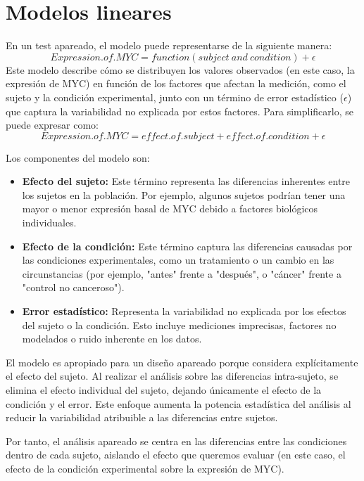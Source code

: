 \documentclass{config/apuntes}\usepackage[]{graphicx}\usepackage[]{xcolor}
\begin{document}
\section{Modelos lineares}
En un test apareado, el modelo puede representarse de la siguiente manera:
\[Expression.of.MYC = function(subject\ and\ condition) + \epsilon\]
Este modelo describe cómo se distribuyen los valores observados (en este caso, la expresión de MYC) en función de los factores que afectan la medición, como el sujeto y la condición experimental, junto con un término de error estadístico ($\epsilon$) que captura la variabilidad no explicada por estos factores. 
Para simplificarlo, se puede expresar como:
\[Expression.of.MYC = \mathit{effect.of.subject} + \mathit{effect.of.condition} + \epsilon\]

Los componentes del modelo son:
\begin{itemize}
\item \textbf{Efecto del sujeto:} Este término representa las diferencias inherentes entre los sujetos en la población. Por ejemplo, algunos sujetos podrían tener una mayor o menor expresión basal de MYC debido a factores biológicos individuales.
\item \textbf{Efecto de la condición:} Este término captura las diferencias causadas por las condiciones experimentales, como un tratamiento o un cambio en las circunstancias (por ejemplo, "antes" frente a "después", o "cáncer" frente a "control no canceroso").
\item \textbf{Error estadístico:}  Representa la variabilidad no explicada por los efectos del sujeto o la condición. Esto incluye mediciones imprecisas, factores no modelados o ruido inherente en los datos.
\end{itemize}

El modelo es apropiado para un diseño apareado porque considera explícitamente el efecto del sujeto. Al realizar el análisis sobre las diferencias intra-sujeto, se elimina el efecto individual del sujeto, dejando únicamente el efecto de la condición y el error. Este enfoque aumenta la potencia estadística del análisis al reducir la variabilidad atribuible a las diferencias entre sujetos.

Por tanto, el análisis apareado se centra en las diferencias entre las condiciones dentro de cada sujeto, aislando el efecto que queremos evaluar (en este caso, el efecto de la condición experimental sobre la expresión de MYC).
\end{document}
